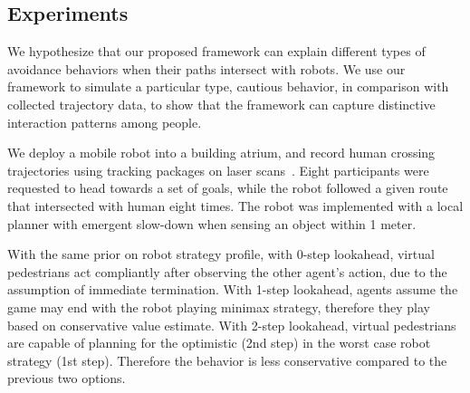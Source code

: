 \documentclass[letterpaper, 10 pt, conference]{ieeeconf}  %
\begin{document}

\vspace{-.4em}
\subsection{Experiments}
\vspace{-.2em}
We hypothesize that our proposed framework can explain different types of 
avoidance behaviors when their paths intersect with robots. We use our 
framework to simulate a particular type, cautious behavior, in comparison with 
collected trajectory data, to show that the framework can capture distinctive 
interaction patterns among people.

We deploy a mobile robot into a building atrium, and record human crossing 
trajectories using tracking packages on laser scans~\cite{leigh2015person}. 
Eight participants were requested to head towards a set of goals, while the 
robot followed a given route that intersected with human eight times.
The robot was implemented with a 
local planner with emergent slow-down when sensing an object within 1 meter. 

With the same prior on robot strategy profile, with 0-step lookahead, 
virtual pedestrians act compliantly after observing the other agent's action, 
due to the assumption of immediate termination. With 1-step lookahead, agents assume 
the game may end with the robot playing minimax strategy, therefore they play 
based on conservative value estimate. With 2-step lookahead, virtual 
pedestrians are capable of planning for the optimistic (2nd step) in the 
worst case robot strategy (1st step). Therefore the behavior is less 
conservative compared to the previous two options. 
\end{document}
